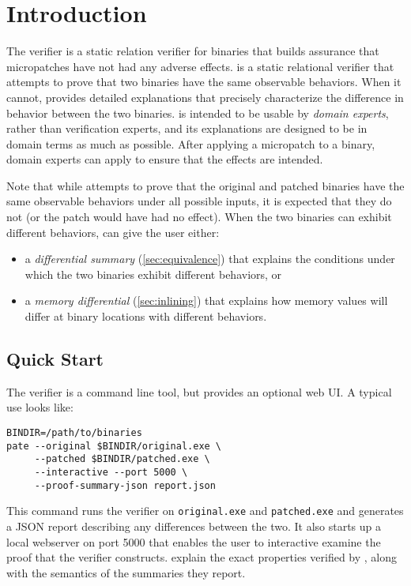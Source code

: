 \section{Introduction}\label{sec:introduction}

The \TOOL{} verifier is a static relation verifier for binaries that builds assurance that micropatches have not had any adverse effects. %
\TOOL{} is a static relational verifier that attempts to prove that two binaries have the same observable behaviors. %
When it cannot, \TOOL{} provides detailed explanations that precisely characterize the difference in behavior between the two binaries. %
\TOOL{} is intended to be usable by \emph{domain experts}, rather than verification experts, and its explanations are designed to be in domain terms as much as possible. %
After applying a micropatch to a binary, domain experts can apply \TOOL{} to ensure that the effects are intended. %

Note that while \TOOL{} attempts to prove that the original and patched binaries have the same observable behaviors under all possible inputs, it is expected that they do not (or the patch would have had no effect). %
When the two binaries can exhibit different behaviors, \TOOL{} can give the user either: %
\begin{itemize}
\item a \emph{differential summary} (\cref{sec:equivalence}) that explains the conditions under which the two binaries exhibit different behaviors, or
\item a \emph{memory differential} (\cref{sec:inlining}) that explains how memory values will differ at binary locations with different behaviors.
\end{itemize}

\subsection{Quick Start}\label{sec:quick-start}

The \TOOL{} verifier is a command line tool, but provides an optional web UI\@. %
A typical use looks like: %

\begin{lstlisting}
BINDIR=/path/to/binaries
pate --original $BINDIR/original.exe \
     --patched $BINDIR/patched.exe \
     --interactive --port 5000 \
     --proof-summary-json report.json
\end{lstlisting}

This command runs the verifier on \lstinline{original.exe} and \lstinline{patched.exe} and generates a JSON report describing any differences between the two. %
It also starts up a local webserver on port 5000 that enables the user to interactive examine the proof that the verifier constructs. %
 explain the exact properties verified by \TOOL{}, along with the semantics of the summaries they report. %


